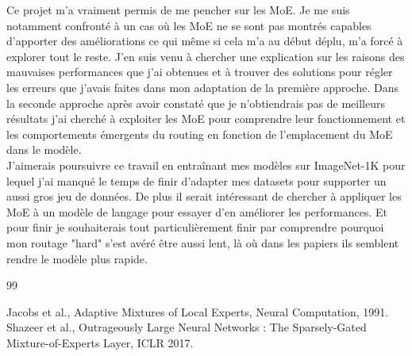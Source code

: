 \documentclass{article}
\begin{document}
Ce projet m'a vraiment permis de me pencher sur les MoE. Je me suis notamment confronté à un cas où les MoE ne se sont pas montrés capables d'apporter des améliorations ce qui même si cela m'a au début déplu, m'a forcé à explorer tout le reste. J'en suis venu à chercher une explication sur les raisons des mauvaises performances que j'ai obtenues et à trouver des solutions pour régler les erreurs que j'avais faites dans mon adaptation de la première approche. Dans la seconde approche après avoir constaté que je n'obtiendrais pas de meilleurs résultats j'ai cherché à exploiter les MoE pour comprendre leur fonctionnement et les comportements émergents du routing en fonction de l'emplacement du MoE dans le modèle. \\
J'aimerais poursuivre ce travail en entraînant mes modèles sur ImageNet-1K pour lequel j'ai manqué le temps de finir d'adapter mes datasets pour supporter un aussi gros jeu de données. De plus il serait intéressant de chercher à appliquer les MoE à un modèle de langage pour essayer d'en améliorer les performances. Et pour finir je souhaiterais tout particulièrement finir par comprendre pourquoi mon routage "hard" s'est avéré être aussi lent, là où dans les papiers ils semblent rendre le modèle plus rapide.

\begin{thebibliography}{99}

 Jacobs et al., Adaptive Mixtures of Local Experts, Neural Computation, 1991.
 Shazeer et al., Outrageously Large Neural Networks : The Sparsely-Gated Mixture-of-Experts Layer, ICLR 2017.


\end{thebibliography}
\end{document}

